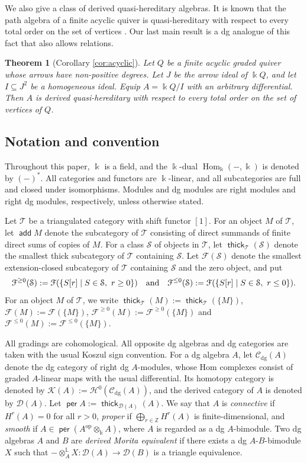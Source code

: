 \documentclass[a4paper,reqno,11pt]{amsart}
\numberwithin{equation}{section}
\newtheorem{theorem}{Theorem}[section]
\theoremstyle{definition}
\newcommand{\C}{\mathcal{C}}
\newcommand{\D}{\mathcal{D}}
\newcommand{\F}{\mathcal{F}}
\renewcommand{\H}{\mathcal{H}}
\newcommand{\K}{\mathcal{K}}
\renewcommand{\S}{\mathcal{S}}
\newcommand{\T}{\mathcal{T}}
\newcommand{\LL}{\mathbb{L}}
\newcommand{\ZZ}{\mathbb{Z}}
\newcommand{\kk}{\Bbbk}
\newcommand{\op}{\mathrm{op}}
\DeclareMathOperator{\add}{\mathsf{add}}
\DeclareMathOperator{\thick}{\mathsf{thick}}
\DeclareMathOperator{\per}{\mathsf{per}}
\DeclareMathOperator{\Hom}{Hom}
\newcommand{\dgmod}{\C_{\mathrm{dg}}}
\begin{document}
We also give a class of derived quasi-hereditary algebras.
It is known that the path algebra of a finite acyclic quiver is quasi-hereditary with respect to every total order on the set of vertices \cite{DR89}.
Our last main result is a dg analogue of this fact that also allows relations.

\begin{theorem}[Corollary \ref{cor:acyclic}]
Let $Q$ be a finite acyclic graded quiver whose arrows have non-positive degrees.
Let $J$ be the arrow ideal of $\kk Q$, and let $I\subseteq J^{2}$ be a homogeneous ideal.
Equip $A=\kk Q/I$ with an arbitrary differential.
Then $A$ is derived quasi-hereditary with respect to every total order on the set of vertices of $Q$.
\end{theorem}

\subsection*{Notation and convention}

Throughout this paper, $\kk$ is a field, and the $\kk$-dual $\Hom_{\kk}(-,\kk)$ is denoted by $(-)^{\ast}$.
All categories and functors are $\kk$-linear, and all subcategories are full and closed under isomorphisms.
Modules and dg modules are right modules and right dg modules, respectively, unless otherwise stated.

Let $\T$ be a triangulated category with shift functor $[1]$.
For an object $M$ of $\T$, let $\add M$ denote the subcategory of $\T$ consisting of direct summands of finite direct sums of copies of $M$.
For a class $\S$ of objects in $\T$, let $\thick_{\T}(\S)$ denote the smallest thick subcategory of $\T$ containing $\S$.
Let $\F(\S)$ denote the smallest extension-closed subcategory of $\T$ containing $\S$ and the zero object, and put
\begin{align}
\F^{\geq 0}(\S):=\F(\{S[r]\mid S\in\S,\ r\geq 0\}) \quad\text{and}\quad \F^{\leq 0}(\S):=\F(\{S[r]\mid S\in\S,\ r\leq 0\}).\notag
\end{align}
For an object $M$ of $\T$, we write $\thick_{\T}(M):=\thick_{\T}(\{M\})$, $\F(M):=\F(\{M\})$, $\F^{\geq 0}(M):=\F^{\geq 0}(\{M\})$ and $\F^{\leq 0}(M):=\F^{\leq 0}(\{M\})$.

All gradings are cohomological.
All opposite dg algebras and dg categories are taken with the usual Koszul sign convention.
For a dg algebra $A$, let $\dgmod(A)$ denote the dg category of right dg $A$-modules, whose Hom complexes consist of graded $A$-linear maps with the usual differential.
Its homotopy category is denoted by $\K(A):=\H^{0}(\dgmod(A))$, and the derived category of $A$ is denoted by $\D(A)$.
Let $\per A:=\thick_{\D(A)}(A)$.
We say that $A$ is \emph{connective} if $H^{r}(A)=0$ for all $r>0$, \emph{proper} if $\bigoplus_{r\in\ZZ}H^{r}(A)$ is finite-dimensional, and \emph{smooth} if $A\in\per(A^{\op}\otimes_{\kk}A)$, where $A$ is regarded as a dg $A$-bimodule.
Two dg algebras $A$ and $B$ are \emph{derived Morita equivalent} if there exists a dg $A$-$B$-bimodule $X$ such that $-\otimes^{\LL}_{A}X\colon\D(A)\to\D(B)$ is a triangle equivalence.
\end{document}
